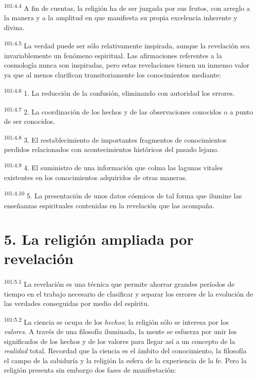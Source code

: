 \par
\textsuperscript{101:4.4} A fin de cuentas, la religión ha de ser juzgada por sus frutos, con arreglo a la manera y a la amplitud en que manifiesta su propia excelencia inherente y divina.

\par
\textsuperscript{101:4.5} La verdad puede ser sólo relativamente inspirada, aunque la revelación sea invariablemente un fenómeno espiritual. Las afirmaciones referentes a la cosmología nunca son inspiradas, pero estas revelaciones tienen un inmenso valor ya que al menos clarifican transitoriamente los conocimientos mediante:

\par
\textsuperscript{101:4.6} 1. La reducción de la confusión, eliminando con autoridad los errores.

\par
\textsuperscript{101:4.7} 2. La coordinación de los hechos y de las observaciones conocidos o a punto de ser conocidos.

\par
\textsuperscript{101:4.8} 3. El restablecimiento de importantes fragmentos de conocimientos perdidos relacionados con acontecimientos históricos del pasado lejano.

\par
\textsuperscript{101:4.9} 4. El suministro de una información que colma las lagunas vitales existentes en los conocimientos adquiridos de otras maneras.

\par
\textsuperscript{101:4.10} 5. La presentación de unos datos cósmicos de tal forma que ilumine las enseñanzas espirituales contenidas en la revelación que las acompaña.

\section*{5. La religión ampliada por revelación}
\par
\textsuperscript{101:5.1} La revelación es una técnica que permite ahorrar grandes períodos de tiempo en el trabajo necesario de clasificar y separar los errores de la evolución de las verdades conseguidas por medio del espíritu.

\par
\textsuperscript{101:5.2} La ciencia se ocupa de los \textit{hechos}; la religión sólo se interesa por los \textit{valores}. A través de una filosofía iluminada, la mente se esfuerza por unir los significados de los hechos y de los valores para llegar así a un concepto de la \textit{realidad} total. Recordad que la ciencia es el ámbito del conocimiento, la filosofía el campo de la sabiduría y la religión la esfera de la experiencia de la fe. Pero la religión presenta sin embargo dos fases de manifestación:

